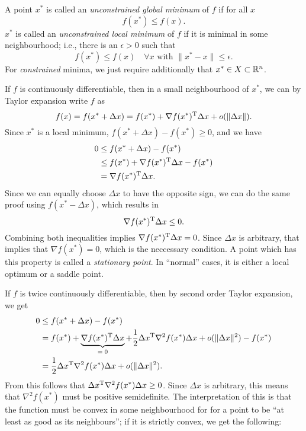 \documentclass{article}
\begin{document}
A point \(x^*\) is called an \emph{unconstrained global minimum} of \(f\) if for all \(x\)
\begin{equation*}
  f(x^*) \leq f(x).
\end{equation*}
\(x^*\) is called an \emph{unconstrained local minimum} of \(f\) if it is minimal in some
neighbourhood; i.e., there is an \(\epsilon > 0\) such that
\begin{equation*}
  f(x^*) \leq f(x) \quad \forall x \text{ with } \lVert x^* - x \rVert \leq \epsilon.
\end{equation*}
For \emph{constrained} minima, we just require additionally that \(x^* \in X \subset \mathbb{R}^n\).


\label{s:first-order-optimality}

If \(f\) is continuously differentiable, then in a small neighbourhood of \(x^*\), we can by Taylor
expansion write \(f\) as
\begin{equation*}
  f(x) = f(x^* + \Delta x) = f(x^*) + \nabla f(x^*)^{\mathrm{T}} \Delta x + o(\lVert \Delta x \rVert).
\end{equation*}
Since \(x^*\) is a local minimum, \(f(x^* + \Delta x) - f(x^*) \geq 0\), and we have
\begin{align*}
  0 &\leq f(x^* + \Delta x) - f(x^*) \\
    &\leq f(x^*) + \nabla f(x^*)^{\mathrm{T}} \Delta x - f(x^*) \\
    &= \nabla f(x^*)^{\mathrm{T}} \Delta x.
\end{align*}
Since we can equally choose \(\Delta x\) to have the opposite sign, we can do the same proof using
\(f(x^* - \Delta x)\), which results in
\begin{equation*}
  \nabla f(x^*)^{\mathrm{T}} \Delta x \leq 0.
\end{equation*}
Combining both inequalities implies \(\nabla f(x^*)^{\mathrm{T}} \Delta x = 0\).  Since \(\Delta x\) is
arbitrary, that implies that \(\nabla f(x^*) = 0\), which is the neccessary condition.  A point
which has this property is called a \emph{stationary point}.  In ``normal'' cases, it is either a
local optimum or a saddle point.


\label{s:second-order-optimality}

If \(f\) is twice continuously differentiable, then by second order Taylor expansion, we get
\begin{align*}
  0 &\leq f(x^* + \Delta x) - f(x^*) \\
    &= f(x^*) + \underbrace{\nabla f(x^*)^{\mathrm{T}} \Delta x}_{=\; 0} +
      \frac{1}{2} \Delta x^{\mathrm{T}} \nabla^2 f(x^*) \Delta x + o(\lVert \Delta x \rVert^2) - f(x^*) \\
    &=  \frac{1}{2} \Delta x^{\mathrm{T}} \nabla^2 f(x^*) \Delta x + o(\lVert \Delta x \rVert^2).
\end{align*}
From this follows that \(\Delta x^{\mathrm{T}} \nabla^2 f(x^*) \Delta x \geq 0\).  Since \(\Delta x\) is
arbitrary, this means that \(\nabla^2 f(x^*)\) must be positive semidefinite.  The interpretation of
this is that the function must be convex in some neighbourhood for for a point to be ``at least as
good as its neighbours''; if it is strictly convex, we get the following:
\end{document}
